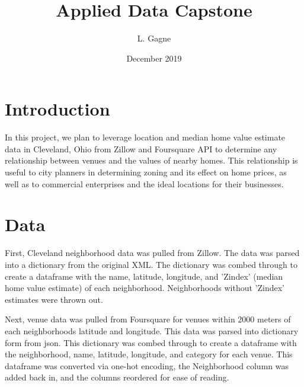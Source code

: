 \documentclass[twoside,14pt]{report}
\title{Applied Data Capstone}
\author{L. Gagne}
\date{December 2019}
\begin{document}
\maketitle

\chapter*{Introduction}


In this project, we plan to leverage location and median home value estimate data in Cleveland, Ohio from Zillow and Foursquare API to determine any relationship between venues and the values of nearby homes.  This relationship is useful to city planners in determining zoning and its effect on home prices, as well as to commercial enterprises and the ideal locations for their businesses.

\chapter*{Data}


First, Cleveland neighborhood data was pulled from Zillow.  The data was parsed into a dictionary from the original XML.  The dictionary was combed through to create a dataframe with the name, latitude, longitude, and 'Zindex' (median home value estimate) of each neighborhood.  Neighborhoods without 'Zindex' estimates were thrown out.



Next, venue data was pulled from Foursquare for venues within 2000 meters of each neighborhoods latitude and longitude.  This data was parsed into dictionary form from json.  This dictionary was combed through to create a dataframe with the neighborhood, name, latitude, longitude, and category for each venue.  This dataframe was converted via one-hot encoding, the Neighborhood column was added back in, and the columns reordered for ease of reading. 
\end{document}
